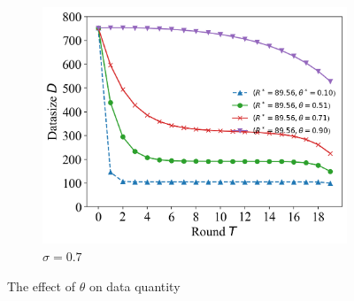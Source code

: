 \documentclass{article}
\theoremstyle{plain}
\theoremstyle{definition}
\theoremstyle{remark}
\begin{document}
\begin{figure}
\begin{subfigure}{0.31\textwidth}
		\includegraphics[width=\textwidth]{figures/figure_63_C.png}
    \caption{$\sigma=0.7$}
	\end{subfigure}
	\caption{The effect of $\theta$ on data quantity}
\end{figure}
\end{document}
